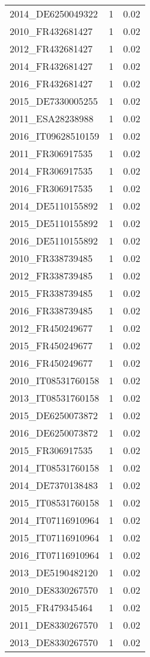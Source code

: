 \begin{table*}[htbp]
\begin{tabular}{lrr}
2014_DE6250049322 & 1 & 0.02 \\
2010_FR432681427 & 1 & 0.02 \\
2012_FR432681427 & 1 & 0.02 \\
2014_FR432681427 & 1 & 0.02 \\
2016_FR432681427 & 1 & 0.02 \\
2015_DE7330005255 & 1 & 0.02 \\
2011_ESA28238988 & 1 & 0.02 \\
2016_IT09628510159 & 1 & 0.02 \\
2011_FR306917535 & 1 & 0.02 \\
2014_FR306917535 & 1 & 0.02 \\
2016_FR306917535 & 1 & 0.02 \\
2014_DE5110155892 & 1 & 0.02 \\
2015_DE5110155892 & 1 & 0.02 \\
2016_DE5110155892 & 1 & 0.02 \\
2010_FR338739485 & 1 & 0.02 \\
2012_FR338739485 & 1 & 0.02 \\
2015_FR338739485 & 1 & 0.02 \\
2016_FR338739485 & 1 & 0.02 \\
2012_FR450249677 & 1 & 0.02 \\
2015_FR450249677 & 1 & 0.02 \\
2016_FR450249677 & 1 & 0.02 \\
2010_IT08531760158 & 1 & 0.02 \\
2013_IT08531760158 & 1 & 0.02 \\
2015_DE6250073872 & 1 & 0.02 \\
2016_DE6250073872 & 1 & 0.02 \\
2015_FR306917535 & 1 & 0.02 \\
2014_IT08531760158 & 1 & 0.02 \\
2014_DE7370138483 & 1 & 0.02 \\
2015_IT08531760158 & 1 & 0.02 \\
2014_IT07116910964 & 1 & 0.02 \\
2015_IT07116910964 & 1 & 0.02 \\
2016_IT07116910964 & 1 & 0.02 \\
2013_DE5190482120 & 1 & 0.02 \\
2010_DE8330267570 & 1 & 0.02 \\
2015_FR479345464 & 1 & 0.02 \\
2011_DE8330267570 & 1 & 0.02 \\
2013_DE8330267570 & 1 & 0.02 \\

\end{tabular}
\end{table*}
